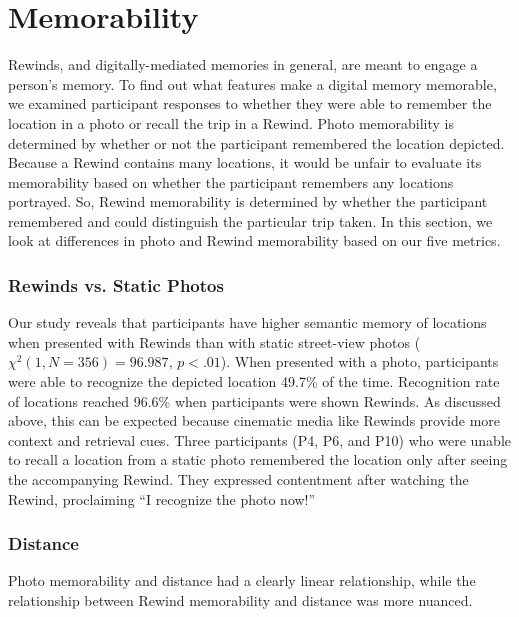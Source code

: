 \documentclass{sigchi}
\begin{document}
\section{Memorability}
Rewinds, and digitally-mediated memories in general, are meant to engage a person's memory. To find out what features make a digital memory memorable, we examined participant responses to whether they were able to remember the location in a photo or recall the trip in a Rewind. Photo memorability is determined by whether or not the participant remembered the location depicted. Because a Rewind contains many locations, it would be unfair to evaluate its memorability based on whether the participant remembers any locations portrayed. So, Rewind memorability is determined by whether the participant remembered and could distinguish the particular trip taken. In this section, we look at differences in photo and Rewind memorability based on our five metrics.

\subsubsection{Rewinds vs. Static Photos} 
Our study reveals that participants have higher semantic memory of locations when presented with Rewinds than with static street-view photos ($\chi^2(1, N=356) = 96.987$, $p < .01$). When presented with a photo, participants were able to recognize the depicted location 49.7\% of the time. Recognition rate of locations reached 96.6\% when participants were shown Rewinds. As discussed above, this can be expected because cinematic media like Rewinds provide more context and retrieval cues. Three participants (P4, P6, and P10) who were unable to recall a location from a static photo remembered the location only after seeing the accompanying Rewind. They expressed contentment after watching the Rewind, proclaiming ``I recognize the photo now!''

\subsubsection{Distance}
Photo memorability and distance had a clearly linear relationship, while the relationship between Rewind memorability and distance was more nuanced. 
\end{document}
